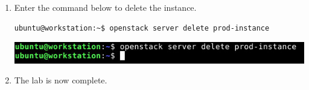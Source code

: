 \documentclass[letterpaper, 12pt]{article}
\begin{document}
\begin{enumerate}
    \item Enter the command below to delete the instance.
\begin{lstlisting}
ubuntu@workstation:~$ openstack server delete prod-instance
\end{lstlisting}

    \begin{center}
        \includegraphics[width=\linewidth]{images/part_2_step_21.png}
    \end{center}

    \item The lab is now complete.

\end{enumerate}
\end{document}
